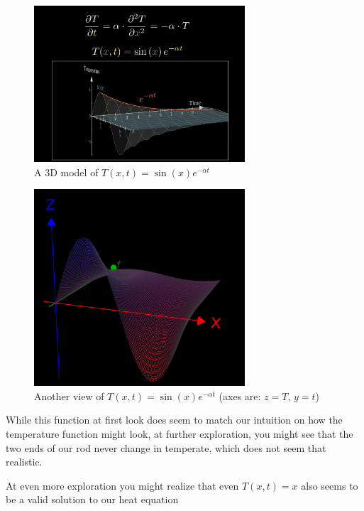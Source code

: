 \documentclass{report}
\begin{document}
\begin{figure}[H]
    \centering
    \includegraphics[width=0.7\textwidth]{images/sinx_temperature_function.png}
    \caption{A 3D model of $T(x,t) = \sin(x)e^{-\alpha t}$ }
\end{figure}

\begin{figure}[H]
    \centering
    \includegraphics[width=0.7\textwidth]{images/sinx_temperature_function_2.png}
    \caption{Another view of $T(x,t) = \sin(x)e^{-\alpha t}$ (axes are: $z = T$, $y = t$) }
\end{figure}

While this function at first look does seem to match our intuition on how the temperature
function might look, at further exploration, you might see that the two ends of our rod never change in temperate, which
does not seem that realistic. 

At even more exploration you might realize that even $T(x,t) = x$ also seems to be a valid solution
to our heat equation
\end{document}

